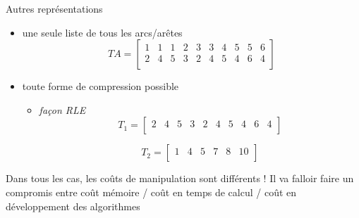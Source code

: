 \begin{frame}{Autres représentations}
    \begin{itemize}
        \item une seule liste de tous les arcs/arêtes 
        \begin{equation*}
            TA = \left[
              \begin{array}{cccccccccc}
              1 & 1 & 1 & 2 & 3 & 3 & 4 & 5 & 5 & 6 \\
              2 & 4 & 5 & 3 & 2 & 4 & 5 & 4 & 6 & 4 \\
              \end{array}
              \right]
          \end{equation*}          
        \item toute forme de compression possible 
        \begin{itemize}
            \item \textit{façon RLE}
            \begin{equation*}
                T_1 = \left[
                  \begin{array}{cccccccccc}
                  2 & 4 & 5 & 3 & 2 & 4 & 5 & 4 & 6 & 4 \\
                  \end{array}
                  \right]
              \end{equation*}
              
              \begin{equation*}
                T_2 = \left[
                  \begin{array}{cccccc}
                   1 & 4 & 5 & 7 & 8 & 10 \\
                  \end{array}
                  \right]
              \end{equation*}
              
        \end{itemize}
    \end{itemize}
    \pause 
    \alert{Dans tous les cas, les coûts de manipulation sont différents ! Il va falloir faire un compromis entre coût mémoire / coût en temps de calcul / coût en développement des algorithmes}
\end{frame}